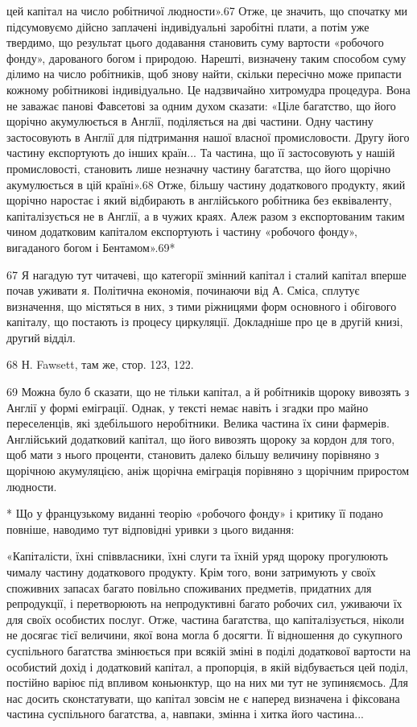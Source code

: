цей капітал на число робітничої людности».67 Отже, це значить,
що спочатку ми підсумовуємо дійсно заплачені індивідуальні
заробітні плати, а потім уже твердимо, що результат цього додавання
становить суму вартости «робочого фонду», дарованого
богом і природою. Нарешті, визначену таким способом суму
ділимо на число робітників, щоб знову найти, скільки пересічно
може припасти кожному робітникові індивідуально. Це надзвичайно
хитромудра процедура. Вона не заважає панові Фавсетові
за одним духом сказати: «Ціле багатство, що його щорічно
акумулюється в Англії, поділяється на дві частини. Одну
частину застосовують в Англії для підтримання нашої власної
промисловости. Другу його частину експортують до інших
країн... Та частина, що її застосовують у нашій промисловості,
становить лише незначну частину багатства, що його щорічно
акумулюється в цій країні».68 Отже, більшу частину додаткового
продукту, який щорічно наростає і який відбирають в англійського
робітника без еквіваленту, капіталізується не в Англії,
а в чужих краях. Алеж разом з експортованим таким чином
додатковим капіталом експортують і частину «робочого фонду»,
вигаданого богом і Бентамом».69*

67    Я нагадую тут читачеві, що категорії змінний капітал і сталий
капітал вперше почав уживати я. Політична економія, починаючи від
А. Сміса, сплутує визначення, що містяться в них, з тими ріжницями
форм основного і обігового капіталу, що постають із процесу циркуляції.
Докладніше про це в другій книзі, другий відділ.

68    Н. Fawsett, там же, стор. 123, 122.

69    Можна було б сказати, що не тільки капітал, а й робітників щороку
вивозять з Англії у формі еміграції. Однак, у тексті немає навіть і згадки
про майно переселенців, які здебільшого неробітники. Велика частина
їх сини фармерів. Англійський додатковий капітал, що його вивозять
щороку за кордон для того, щоб мати з нього проценти, становить далеко
більшу величину порівняно з щорічною акумуляцією, аніж щорічна
еміграція порівняно з щорічним приростом людности.

* Що у французькому виданні теорію «робочого фонду» і критику
її подано повніше, наводимо тут відповідні уривки з цього видання:

«Капіталісти, їхні співвласники, їхні слуги та їхній уряд щороку
прогулюють чималу частину додаткового продукту. Крім того, вони
затримують у своїх споживних запасах багато повільно споживаних
предметів, придатних для репродукції, і перетворюють на непродуктивні
багато робочих сил, уживаючи їх для своїх особистих послуг.
Отже, частина багатства, що капіталізується, ніколи не досягає тієї
величини, якої вона могла б досягти. Її відношення до сукупного суспільного
багатства змінюється при всякій зміні в поділі додаткової вартости
на особистий дохід і додатковий капітал, а пропорція, в якій відбувається
цей поділ, постійно варіює під впливом коньюнктур, що на них ми
тут не зупиняємось. Для нас досить сконстатувати, що капітал зовсім
не є наперед визначена і фіксована частина суспільного багатства, а,
навпаки, змінна і хитка його частина...

